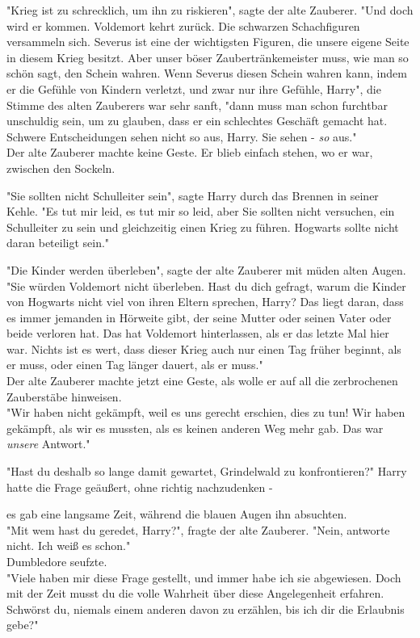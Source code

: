 {"Krieg ist zu schrecklich, um ihn zu riskieren", sagte der alte Zauberer. "Und doch wird er kommen. Voldemort kehrt zurück. Die schwarzen Schachfiguren versammeln sich. Severus ist eine der wichtigsten Figuren, die unsere eigene Seite in diesem Krieg besitzt. Aber unser böser Zaubertränkemeister muss, wie man so schön sagt, den Schein wahren. Wenn Severus diesen Schein wahren kann, indem er die Gefühle von Kindern verletzt, und zwar nur ihre Gefühle, Harry", die Stimme des alten Zauberers war sehr sanft, "dann muss man schon furchtbar unschuldig sein, um zu glauben, dass er ein schlechtes Geschäft gemacht hat. Schwere Entscheidungen sehen nicht so aus, Harry. Sie sehen - \emph{so} aus."\\ Der alte Zauberer machte keine Geste. Er blieb einfach stehen, wo er war, zwischen den Sockeln.

"Sie sollten nicht Schulleiter sein", sagte Harry durch das Brennen in seiner Kehle. "Es tut mir leid, es tut mir so leid, aber Sie sollten nicht versuchen, ein Schulleiter zu sein und gleichzeitig einen Krieg zu führen. Hogwarts sollte nicht daran beteiligt sein."

"Die Kinder werden überleben", sagte der alte Zauberer mit müden alten Augen. "Sie würden Voldemort nicht überleben. Hast du dich gefragt, warum die Kinder von Hogwarts nicht viel von ihren Eltern sprechen, Harry? Das liegt daran, dass es immer jemanden in Hörweite gibt, der seine Mutter oder seinen Vater oder beide verloren hat. Das hat Voldemort hinterlassen, als er das letzte Mal hier war. Nichts ist es wert, dass dieser Krieg auch nur einen Tag früher beginnt, als er muss, oder einen Tag länger dauert, als er muss."\\ Der alte Zauberer machte jetzt eine Geste, als wolle er auf all die zerbrochenen Zauberstäbe hinweisen.\\ "Wir haben nicht gekämpft, weil es uns gerecht erschien, dies zu tun! Wir haben gekämpft, als wir es mussten, als es keinen anderen Weg mehr gab. Das war \emph{unsere} Antwort."

"Hast du deshalb so lange damit gewartet, Grindelwald zu konfrontieren?" Harry hatte die Frage geäußert, ohne richtig nachzudenken -

es gab eine langsame Zeit, während die blauen Augen ihn absuchten.\\ "Mit wem hast du geredet, Harry?", fragte der alte Zauberer. "Nein, antworte nicht. Ich weiß es schon."\\ Dumbledore seufzte.\\ "Viele haben mir diese Frage gestellt, und immer habe ich sie abgewiesen. Doch mit der Zeit musst du die volle Wahrheit über diese Angelegenheit erfahren. Schwörst du, niemals einem anderen davon zu erzählen, bis ich dir die Erlaubnis gebe?"

}
